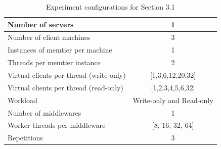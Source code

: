 \documentclass[11pt,a4paper]{article}
\begin{document}
\begin{table}
    \centering
	\begin{tabular}{|l|c|}
		\hline Number of servers                & 1                        \\ 
		\hline Number of client machines        & 3                        \\ 
		\hline Instances of memtier per machine & 1                        \\ 
		\hline Threads per memtier instance     & 2                        \\
		\hline Virtual clients per thread (write-only)  & [1,3,6,12,20,32] \\ 
		\hline Virtual clients per thread (read-only)   & [1,2,3,4,5,6,32] \\ 
		\hline Workload                         & Write-only and Read-only \\
		\hline Number of middlewares            & 1                        \\
		\hline Worker threads per middleware    & [8, 16, 32, 64]          \\
		\hline Repetitions                      & 3                        \\ 
		\hline 
	\end{tabular}
	\caption{Experiment configurations for Section 3.1} \label{exp3-1}
\end{table}
\end{document}
